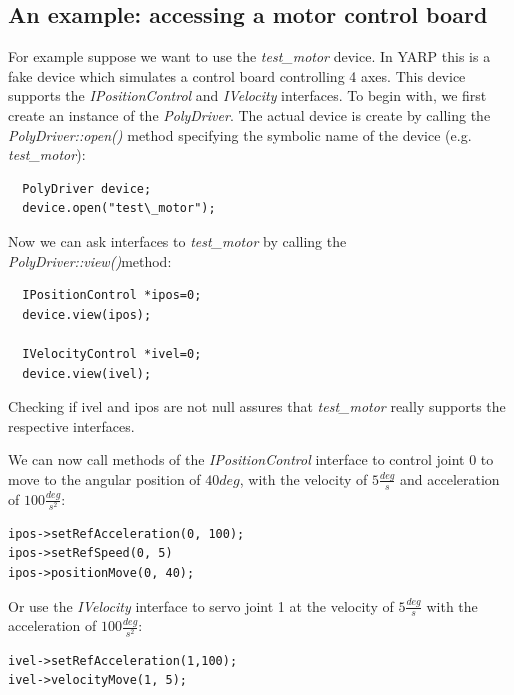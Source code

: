 \subsection{An example: accessing a motor control board}
For example suppose we want to use the \emph{test\_motor} device. In 
YARP this is a fake device which simulates a control board controlling 
4 axes. This device supports the \emph{IPositionControl} and 
\emph{IVelocity} interfaces. To begin with, we first create an 
instance of the \emph{PolyDriver}. The actual device is create by 
calling the \emph{PolyDriver::open()} method specifying the symbolic 
name of the device (e.g. \emph{test\_motor}):

\begin{verbatim}
  PolyDriver device;
  device.open("test\_motor");
\end{verbatim}

Now we can ask interfaces to \emph{test\_motor} by calling the 
\emph{PolyDriver::view()}method:

\begin{verbatim}
  IPositionControl *ipos=0;
  device.view(ipos);

  IVelocityControl *ivel=0;
  device.view(ivel);
\end{verbatim}

Checking if ivel and ipos are not null assures that \emph{test\_motor} 
really supports the respective interfaces.

We can now call methods of the \emph{IPositionControl} interface to control 
joint $0$ to move to the angular position of $40deg$, with the velocity 
of $5\frac{deg}{s}$ and acceleration of $100\frac{deg}{s^2}$:

\begin{verbatim}
ipos->setRefAcceleration(0, 100);
ipos->setRefSpeed(0, 5)
ipos->positionMove(0, 40);
\end{verbatim}

Or use the \emph{IVelocity} interface to servo joint 1 at the velocity 
of $5\frac{deg}{s}$ with the acceleration of $100\frac{deg}{s^2}$:

\begin{verbatim}
ivel->setRefAcceleration(1,100);
ivel->velocityMove(1, 5);
\end{verbatim}

